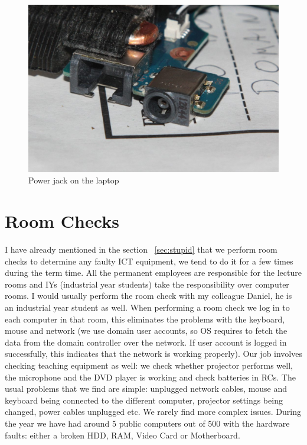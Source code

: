 \documentclass[10pt,a4paper,headinclude=true]{report}
\begin{document}
\begin{figure}[H]
\centering
\centerline{\includegraphics[scale=0.4]{./powerJack}}
\caption{Power jack on the laptop}
\label{fig:power jack}
\end{figure}

\section{Room Checks}
I have already mentioned in the section ~\ref{sec:stupid} that we perform room checks to determine any faulty ICT equipment, we tend to do it for a few times during the term time. All the permanent employees are responsible for the lecture rooms and IYs (industrial year students) take the responsibility over computer rooms. I would usually perform the room check with my colleague Daniel, he is an industrial year student as well. When performing a room check we log in to each computer in that room, this eliminates the problems with the keyboard, mouse and network (we use domain user accounts, so OS requires to fetch the data from the domain controller over the network. If user account is logged in successfully, this indicates that the network is working properly). Our job involves checking teaching equipment as well: we check whether projector performs well, the microphone and the DVD player is working and check batteries in RCs. The usual problems that we find are simple: unplugged network cables, mouse and keyboard being connected to the different computer, projector settings being changed, power cables unplugged etc. We rarely find more complex issues. During the year we have had around 5 public computers out of 500 with the hardware faults: either a broken HDD, RAM, Video Card or Motherboard. 
\end{document}
